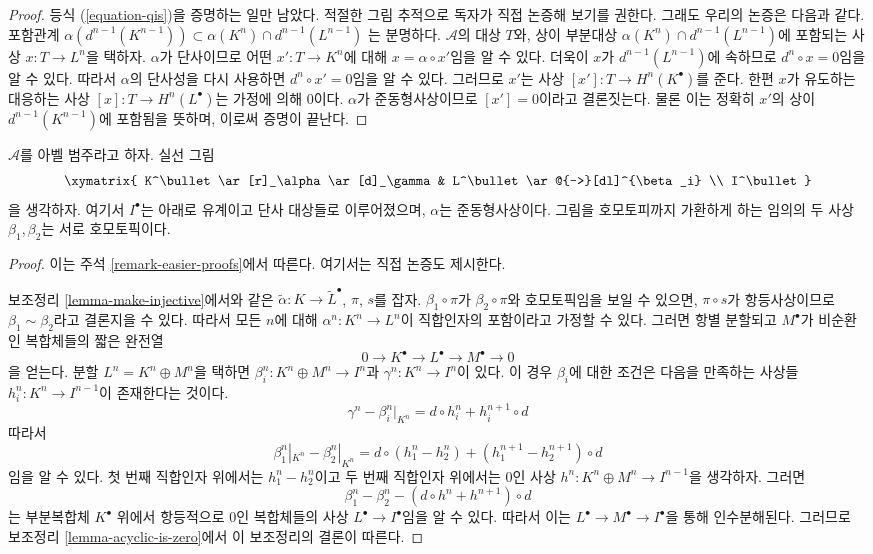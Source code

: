 \begin{proof}
\medskip\noindent
등식 (\ref{equation-qis})을 증명하는 일만 남았다. 적절한 그림 추적으로
독자가 직접 논증해 보기를 권한다. 그래도 우리의 논증은 다음과 같다.
포함관계
$\alpha(d^{n - 1}(K^{n - 1})) \subset \alpha(K^n) \cap d^{n - 1}(L^{n - 1})$
는 분명하다. $\mathcal{A}$의 대상 $T$와, 상이 부분대상
$\alpha(K^n) \cap d^{n - 1}(L^{n - 1})$에 포함되는 사상
$x : T \to L^n$을 택하자. $\alpha$가 단사이므로 어떤
$x' : T \to K^n$에 대해 $x = \alpha \circ x'$임을 알 수 있다.
더욱이 $x$가 $d^{n - 1}(L^{n - 1})$에 속하므로
$d^n \circ x = 0$임을 알 수 있다. 따라서 $\alpha$의 단사성을 다시
사용하면 $d^n \circ x' = 0$임을 알 수 있다. 그러므로 $x'$는 사상
$[x'] : T \to H^n(K^\bullet)$를 준다. 한편 $x$가 유도하는 대응하는
사상 $[x] : T \to H^n(L^\bullet)$는 가정에 의해 0이다.
$\alpha$가 준동형사상이므로 $[x'] = 0$이라고 결론짓는다.
물론 이는 정확히 $x'$의 상이 $d^{n - 1}(K^{n - 1})$에 포함됨을
뜻하며, 이로써 증명이 끝난다.
\end{proof}

\begin{lemma}
\label{lemma-morphisms-equal-up-to-homotopy}
$\mathcal{A}$를 아벨 범주라고 하자. 실선 그림
$$
\xymatrix{
K^\bullet \ar[r]_\alpha \ar[d]_\gamma & L^\bullet \ar@{-->}[dl]^{\beta_i} \\
I^\bullet
}
$$
을 생각하자. 여기서 $I^\bullet$는 아래로 유계이고 단사 대상들로
이루어졌으며, $\alpha$는 준동형사상이다. 그림을 호모토피까지
가환하게 하는 임의의 두 사상 $\beta_1, \beta_2$는 서로 호모토픽이다.
\end{lemma}

\begin{proof}
이는 주석 \ref{remark-easier-proofs}에서 따른다. 여기서는 직접 논증도 제시한다.

\medskip\noindent
보조정리 \ref{lemma-make-injective}에서와 같은
$\tilde \alpha : K \to \tilde L^\bullet$, $\pi$, $s$를 잡자.
$\beta_1 \circ\pi$가 $\beta_2 \circ \pi$와 호모토픽임을 보일 수 있으면,
$\pi \circ s$가 항등사상이므로 $\beta_1 \sim \beta_2$라고 결론지을 수 있다.
따라서 모든 $n$에 대해 $\alpha^n : K^n \to L^n$이 직합인자의
포함이라고 가정할 수 있다. 그러면 항별 분할되고 $M^\bullet$가
비순환인 복합체들의 짧은 완전열
$$
0 \to K^\bullet \to L^\bullet \to M^\bullet \to 0
$$
을 얻는다. 분할 $L^n = K^n \oplus M^n$을 택하면
$\beta_i^n : K^n \oplus M^n \to I^n$과 $\gamma^n : K^n \to I^n$이 있다.
이 경우 $\beta_i$에 대한 조건은 다음을 만족하는 사상들
$h_i^n : K^n \to I^{n - 1}$이 존재한다는 것이다.
$$
\gamma^n - \beta_i^n|_{K^n} = d \circ h_i^n + h_i^{n + 1} \circ d
$$
따라서
$$
\beta_1^n|_{K^n} - \beta_2^n|_{K^n}
=
d \circ (h_1^n - h_2^n) + (h_1^{n + 1} - h_2^{n + 1}) \circ d
$$
임을 알 수 있다. 첫 번째 직합인자 위에서는 $h_1^n - h_2^n$이고
두 번째 직합인자 위에서는 0인 사상
$h^n : K^n \oplus M^n \to I^{n - 1}$을 생각하자. 그러면
$$
\beta_1^n - \beta_2^n
-
(d \circ h^n + h^{n + 1}) \circ d
$$
는 부분복합체 $K^\bullet$ 위에서 항등적으로 0인 복합체들의 사상
$L^\bullet \to I^\bullet$임을 알 수 있다. 따라서 이는
$L^\bullet \to M^\bullet \to I^\bullet$을 통해 인수분해된다.
그러므로 보조정리 \ref{lemma-acyclic-is-zero}에서 이 보조정리의 결론이 따른다.
\end{proof}

